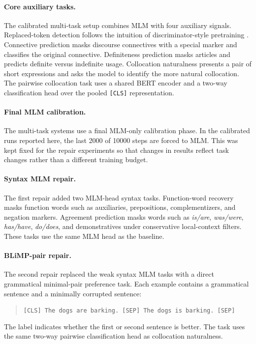 \documentclass[11pt]{article}
\begin{document}
\paragraph{Core auxiliary tasks.}
The calibrated multi-task setup combines MLM with four auxiliary signals. Replaced-token detection follows the intuition of discriminator-style pretraining \citep{clark2020electra}. Connective prediction masks discourse connectives with a special marker and classifies the original connective. Definiteness prediction masks articles and predicts definite versus indefinite usage. Collocation naturalness presents a pair of short expressions and asks the model to identify the more natural collocation. The pairwise collocation task uses a shared BERT encoder and a two-way classification head over the pooled \texttt{[CLS]} representation.

\paragraph{Final MLM calibration.}
The multi-task systems use a final MLM-only calibration phase. In the calibrated runs reported here, the last 2000 of 10000 steps are forced to MLM. This was kept fixed for the repair experiments so that changes in results reflect task changes rather than a different training budget.

\paragraph{Syntax MLM repair.}
The first repair added two MLM-head syntax tasks. Function-word recovery masks function words such as auxiliaries, prepositions, complementizers, and negation markers. Agreement prediction masks words such as \textit{is/are}, \textit{was/were}, \textit{has/have}, \textit{do/does}, and demonstratives under conservative local-context filters. These tasks use the same MLM head as the baseline.

\paragraph{BLiMP-pair repair.}
The second repair replaced the weak syntax MLM tasks with a direct grammatical minimal-pair preference task. Each example contains a grammatical sentence and a minimally corrupted sentence:
\begin{quote}
\small
\texttt{[CLS] The dogs are barking. [SEP] The dogs is barking. [SEP]}
\end{quote}
The label indicates whether the first or second sentence is better. The task uses the same two-way pairwise classification head as collocation naturalness.
\end{document}
